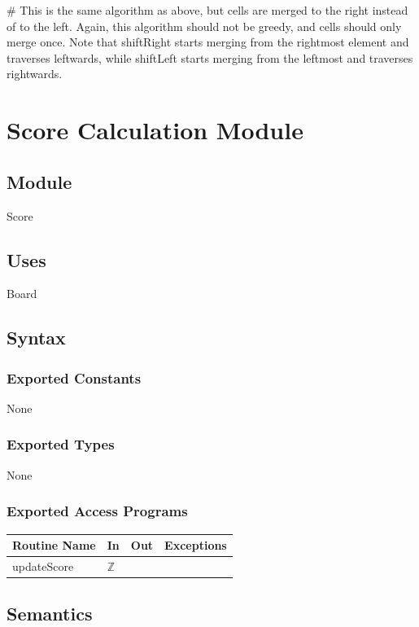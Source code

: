 \documentclass{article}
\begin{document}
		\noindent \# This is the same algorithm as above, but cells are merged to the right instead of to the left. Again, this algorithm should not be greedy, and cells should only merge once. Note that shiftRight starts merging from the rightmost element and traverses leftwards, while shiftLeft starts merging from the leftmost and traverses rightwards.



\newpage

\section*{Score Calculation Module}

	\subsection*{Module}
		Score

	\subsection*{Uses}
		Board

	\subsection*{Syntax}

		\subsubsection*{Exported Constants}
			None

		\subsubsection*{Exported Types}
			None

		\subsubsection*{Exported Access Programs}
			\begin{tabular}{|l|l|l|p{5cm}|}
				\hline
				\textbf{Routine Name} & \textbf{In} & \textbf{Out} & \textbf{Exceptions} \\
				\hline
				updateScore & $\mathbb{Z}$ & &  \\
				\hline
			\end{tabular}

	\subsection*{Semantics}
\end{document}
